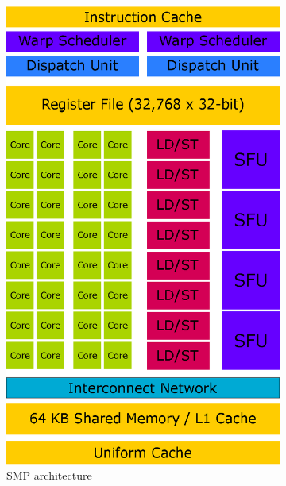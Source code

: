 \begin{figure}[p]
\centering
\begin{subfigure}{0.5\textwidth}
  \centering
  \includegraphics[width=0.8\linewidth]{img/SMPArchitecture.eps}
  \caption{SMP architecture}
  \label{fig:smparchitecture}
\end{subfigure}%
\begin{subfigure}{0.5\textwidth}
  \centering

\end{subfigure}
\end{figure}
